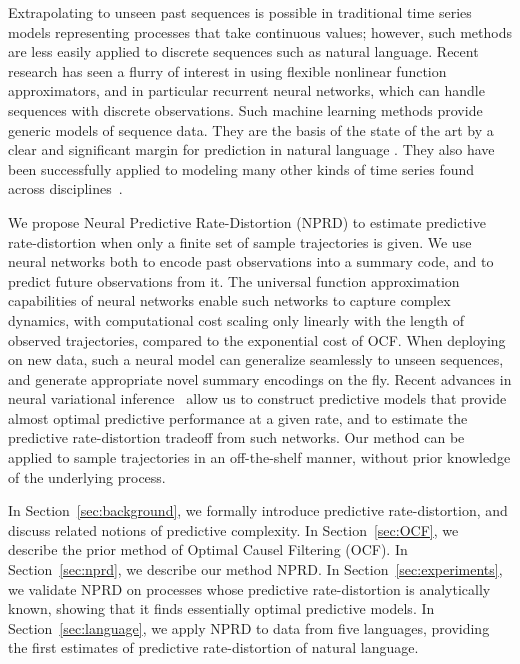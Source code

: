 \documentclass[entropy,article,submit,moreauthors,pdftex,10pt,a4paper]{Definitions/mdpi}
\begin{document}
Extrapolating to unseen past sequences is possible in traditional time series models representing processes that take continuous values; however, such methods are less easily applied to discrete sequences such as natural language.
Recent research has seen a flurry of interest in using flexible nonlinear function approximators, and in particular recurrent neural networks, which can handle sequences with discrete observations.
Such machine learning methods provide generic models of sequence data.
They are the basis of the state of the art by a clear and significant margin for prediction in natural language \citep{DBLP:journals/corr/JozefowiczVSSW16, merity2018analysis, dai2019transformer,takahashi2018cross}.
They also have been successfully applied to modeling many other kinds of time series found across disciplines~\citep{ogunmolu2016nonlinear,laptev2017time,meyer2018survey,hundman2018detecting,white2018forecasting,woo2018dynamic,sirignano2018universal,mohajerin2019multistep}. %

We propose Neural Predictive Rate-Distortion (NPRD) to estimate predictive rate-distortion when only a finite set of sample trajectories is given.
We use neural networks both to encode past observations into a summary code, and to predict future observations from it.
The universal function approximation capabilities of neural networks enable such networks to capture complex dynamics, with computational cost scaling only linearly with the length of observed trajectories, compared to the exponential cost of OCF.
When deploying on new data, such a neural model can generalize seamlessly to unseen sequences, and generate appropriate novel summary encodings on the fly.
Recent advances in neural variational inference~\citep{rezende-variational-2015,huang-neural-2018} allow us to construct predictive models that provide almost optimal predictive performance at a given rate, and to estimate the predictive rate-distortion tradeoff from such networks.
Our method can be applied to sample trajectories in an off-the-shelf manner, without prior knowledge of the underlying process.

In Section~\ref{sec:background}, we formally introduce predictive rate-distortion, and discuss related notions of predictive complexity.
In Section~\ref{sec:OCF}, we describe the prior method of Optimal Causel Filtering (OCF).
In Section~\ref{sec:nprd}, we describe our method NPRD.
In Section~\ref{sec:experiments}, we validate NPRD on processes whose predictive rate-distortion is analytically known, showing that it finds essentially optimal predictive models.
In Section~\ref{sec:language}, we apply NPRD to data from five languages, providing the first estimates of predictive rate-distortion of natural language.
\end{document}
